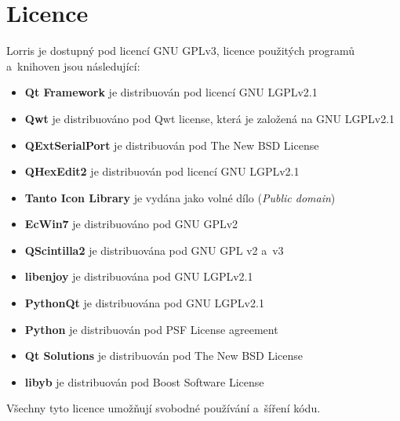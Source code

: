 \documentclass[12pt, a4paper, oneside]{article}
\newcommand{\It}{\textit}  %
\begin{document}
\section*{Licence}
Lorris je dostupný pod licencí GNU GPLv3\cite{gpl3}, licence použitých programů a~knihoven jsou následující:
\begin{itemize}
    \item {\bf Qt Framework} je distribuován pod licencí GNU LGPLv2.1\cite{lgpl}
    \item {\bf Qwt} je distribuováno pod Qwt license\cite{qwtlicense}, která je založená na GNU LGPLv2.1
    \item {\bf QExtSerialPort} je distribuován pod The New BSD License\cite{newbsd}
    \item {\bf QHexEdit2} je distribuován pod licencí GNU LGPLv2.1
    \item {\bf Tanto Icon Library}\cite{tango} je vydána jako volné dílo (\It{Public domain})
    \item {\bf EcWin7} je distribuováno pod GNU GPLv2
    \item {\bf QScintilla2} je distribuována pod GNU GPL v2 a~v3
    \item {\bf libenjoy}\cite{libenjoy} je distribuována pod GNU LGPLv2.1
    \item {\bf PythonQt} je distribuována pod GNU LGPLv2.1
    \item {\bf Python} je distribuován pod PSF License agreement\cite{psf}
    \item {\bf Qt Solutions} je distribuován pod The New BSD License
    \item {\bf libyb} je distribuován pod Boost Software License\cite{boost}
\end{itemize}

Všechny tyto licence umožňují svobodné používání a~šíření kódu.

\newpage
\end{document}
